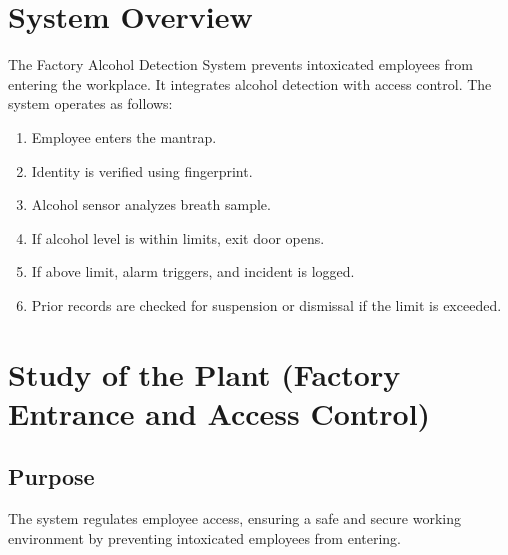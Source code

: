 \documentclass[12pt]{article}
\begin{document}
    
    
    \begingroup
        \hypersetup{linkcolor=black}
        \tableofcontents
        \listoffigures
    \endgroup
    
    \clearpage{}
    
    

    \section{System Overview}
    \label{sec:system_overview}
    The Factory Alcohol Detection System prevents intoxicated employees from entering the workplace. It integrates alcohol detection with access control. The system operates as follows:
    \begin{enumerate}
        \item Employee enters the mantrap.
        \item Identity is verified using fingerprint.
        \item Alcohol sensor analyzes breath sample.
        \item If alcohol level is within limits, exit door opens.
        \item If above limit, alarm triggers, and incident is logged.
        \item Prior records are checked for suspension or dismissal if the limit is exceeded.
    \end{enumerate}

    \section{Study of the Plant (Factory Entrance and Access Control)}
    \label{sec:plant_study}
    \subsection{Purpose}
    The system regulates employee access, ensuring a safe and secure working environment by preventing intoxicated employees from entering.
\end{document}
